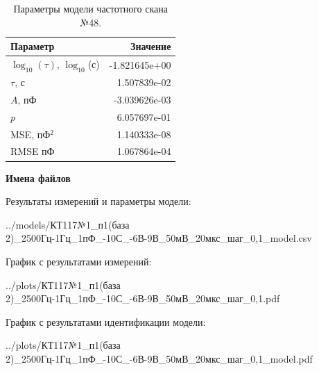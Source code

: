 \begin{table}[!ht]
    \centering
    \caption{Параметры модели частотного скана №48.}
    \begin{tabular}{|l|r|}
        \hline
        Параметр                                       & Значение                  \\ \hline
        $\log_{10}(\tau)$, $\log_{10}$(с)              & -1.821645e+00             \\ \hline
        $\tau$, с                                      & 1.507839e-02              \\ \hline
        $A$, пФ                                        & -3.039626e-03             \\ \hline
        $p$                                            & 6.057697e-01              \\ \hline
        MSE, пФ$^2$                                    & 1.140333e-08              \\ \hline
        RMSE пФ                                        & 1.067864e-04              \\ \hline
    \end{tabular}
    \label{table:frequency_scan_model_48}
\end{table}

\textbf{Имена файлов}

Результаты измерений и параметры модели:

\scriptsize../models/КТ117№1\_п1(база 2)\_2500Гц-1Гц\_1пФ\_-10С\_-6В-9В\_50мВ\_20мкс\_шаг\_0,1\_model.csv
\normalsize

График с результатами измерений:

\scriptsize../plots/КТ117№1\_п1(база 2)\_2500Гц-1Гц\_1пФ\_-10С\_-6В-9В\_50мВ\_20мкс\_шаг\_0,1.pdf
\normalsize

График с результатами идентификации модели:

\scriptsize../plots/КТ117№1\_п1(база 2)\_2500Гц-1Гц\_1пФ\_-10С\_-6В-9В\_50мВ\_20мкс\_шаг\_0,1\_model.pdf
\normalsize

